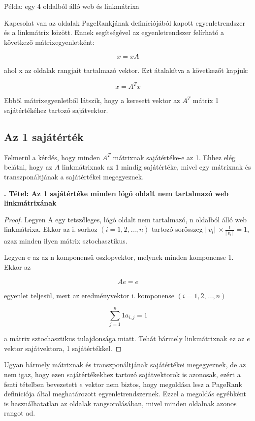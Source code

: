 \documentclass[12pt,a4paper]{article}
\newcounter{tszam}
\newenvironment{tetel}[1]
{{\medskip}\noindent \stepcounter{tszam}
{\bfseries{\thetszam. Tétel: #1\\[1ex]}}}{\bigskip }
\begin{document}
\bigskip
\centerline{Példa: egy 4 oldalból álló web és linkmátrixa}
\bigskip

Kapcsolat van az oldalak PageRankjának definíciójából kapott egyenletrendszer és a linkmátrix között. Ennek segítségével az egyenletrendszer felírható a következő mátrixegyenletként:

\[ x = x A \]

ahol x az oldalak rangjait tartalmazó vektor. Ezt átalakítva a következőt kapjuk:

\[ x = A^T x \]

Ebből mátrixegyenletből látszik, hogy a keresett vektor az $A^T$ mátrix 1 sajátértékéhez tartozó sajátvektor.

\subsection{Az 1 sajátérték}\label{egy_sajatertek}

Felmerül a kérdés, hogy minden $A^T$ mátrixnak sajátértéke-e az 1. Ehhez elég belátni, hogy az $A$ linkmátrixnak az 1 mindig sajátértéke, mivel egy mátrixnak és transzponáltjának a sajátértékei megegyeznek.

\begin{tetel}{Az 1 sajátértéke minden lógó oldalt nem tartalmazó web linkmátrixának}
\end{tetel}
\begin{proof}
	Legyen A egy tetszőleges, lógó oldalt nem tartalmazó, n oldalból álló web linkmátrixa. Ekkor az i. sorhoz $(i = 1,2,...,n)$ tartozó sorösszeg $ |\ v_i |\ \times \frac{1}{|\ v_i |\ } = 1 $, azaz minden ilyen mátrix sztochasztikus.
	
	Legyen e az az n komponensű oszlopvektor, melynek minden komponense 1. Ekkor az
	
	\[ A e = e \] 
	
	egyenlet teljesül, mert az eredményvektor i. komponense $(i = 1,2,...,n)$
	
	\[ \sum_{j=1}^{n}{1 a_{i,j} } = 1 \] 
	
	a mátrix sztochasztikus tulajdonsága miatt. Tehát bármely linkmátrixnak ez az $e$ vektor sajátvektora, 1 sajátértékkel.
	
\end{proof}
\vspace{0.5cm}

Ugyan bármely mátrixnak és transzponáltjának sajátértékei megegyeznek, de az nem igaz, hogy ezen sajátértékekhez tartozó sajátvektorok is azonosak, ezért a fenti tételben bevezetett $e$ vektor nem biztos, hogy megoldása lesz a PageRank definíciója által meghatározott egyenletrendszernek. Ezzel a megoldás egyébként is használhatatlan az oldalak rangsorolásában, mivel minden oldalnak azonos rangot ad.
\end{document}
